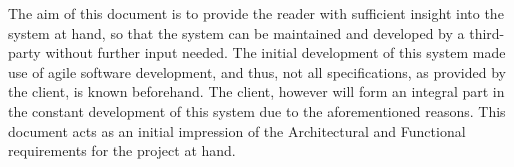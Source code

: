 The aim of this document is to provide the reader with sufficient insight into the system at hand, so that the system can be maintained and developed by a third-party without further input needed. The initial development of this system made use of agile software development, and thus, not all specifications, as provided by the client, is known beforehand. The client, however will form an integral part in the constant development of this system due to the aforementioned reasons. This document acts as an initial impression of the Architectural and Functional requirements for the project at hand.